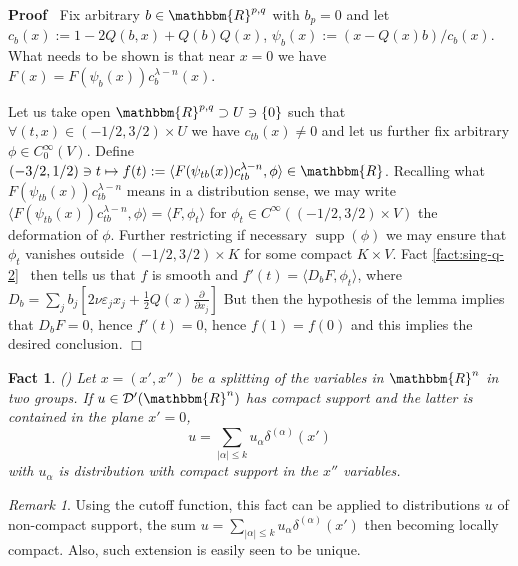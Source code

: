 \documentclass{article}
\newcommand{\assign}{:=}
\newcommand{\tmop}[1]{\ensuremath{\operatorname{#1}}}
\renewenvironment{proof}{\noindent\textbf{Proof\ }}{\hspace*{\fill}$\Box$\medskip}
\newtheorem{fact}[proposition]{Fact}
\theoremstyle{remark}
\newtheorem{remark}[proposition]{Remark}
\newcommand{\D}{\mathcal{D}}
\newcommand{\supp}{\tmop{supp}}
\newcommand{\proofexplanation}[1]{(#1)}
\newcommand{\R}{\mathbbm{R}}
\newcommand{\mysbra}[1]{\left[ #1 \right]}
\begin{document}
\begin{proof}
  Fix arbitrary $b \in \R^{p, q}$ with $b_p = 0$ and let $c_b (x) \assign 1 -
  2 Q (b, x) + Q (b) Q (x)$, $\psi_b (x) \assign (x - Q (x) b) / c_b (x)$.
  What needs to be shown is that near $x = 0$ we have $F (x) = F (\psi_b (x))
  c_b^{\lambda - n} (x)$.
  
  Let us take open $\R^{p, q} \supset U \ni \{ 0 \}$ such that $\forall (t, x)
  \in (- 1 / 2, 3 / 2) \times U$ we have $c_{tb} (x) \neq 0$ and let us
  further fix arbitrary $\phi \in C_0^{\infty} (V)$. Define $(- 3 / 2, 1 / 2)
  \ni t \mapsto f (t) \assign \langle F (\psi_{tb} (x)) c_{tb}^{\lambda - n},
  \phi \rangle \in \R$. Recalling what $F (\psi_{tb} (x)) c_{tb}^{\lambda -
  n}$ means in a distribution sense, we may write $\langle F (\psi_{tb} (x))
  c_{tb}^{\lambda - n}, \phi \rangle = \langle F, \phi_t \rangle$ for $\phi_t
  \in C^{\infty} ((- 1 / 2, 3 / 2) \times V)$ the deformation of $\phi$.
  Further restricting if necessary $\supp (\phi)$ we may ensure that $\phi_t$
  vanishes outside $(- 1 / 2, 3 / 2) \times K$ for some compact $K \times V$.
  Fact \ref{fact:sing-q-2} \ then tells us that $f$ is smooth and $f' (t) =
  \langle D_b F, \phi_t \rangle$, where $D_b = \sum_j b_j \mysbra{2 \nu
  \varepsilon_j x_j + \frac{1}{2} Q (x) \frac{\partial}{\partial x_j}}$ But
  then the hypothesis of the lemma implies that $D_b F = 0$, hence $f' (t) =
  0$, hence $f (1) = f (0)$ and this implies the desired conclusion.
\end{proof}

\begin{fact}
{\proofexplanation{{\cite[Thm. 2.3.5]{hormander1983analysis}}}}
\label{fact:sing-q-3}Let $x = (x', x'')$ be a splitting of the variables in
$\R^n$ in two groups. If $u \in \D' (\R^n)$ has compact support and the latter
is contained in the plane $x' = 0$,
\[ u = \sum_{| \alpha | \leq k} u_{\alpha} \delta^{(\alpha)} (x') \]
with $u_{\alpha}$ is distribution with compact support in the $x''$
variables.
\end{fact}

\begin{remark}
  Using the cutoff function, this fact can be applied to distributions $u$ of
  non-compact support, the sum $u = \sum_{| \alpha | \leq k} u_{\alpha}
  \delta^{(\alpha)} (x')$ then becoming locally compact. Also, such extension
  is easily seen to be unique.
\end{remark}
\end{document}

